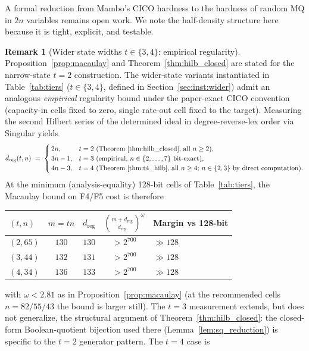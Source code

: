 \documentclass[11pt,a4paper]{article}
\theoremstyle{definition}
\newtheorem{remark}[theorem]{Remark}
\begin{document}
A formal reduction from Mambo's CICO hardness to the hardness of
random MQ in $2n$ variables remains open work. We note the half-density
structure here because it is tight, explicit, and testable.

\begin{remark}[Wider state widths $t \in \{3, 4\}$: empirical regularity]\label{rem:dreg_wider}
Proposition~\ref{prop:macaulay} and Theorem~\ref{thm:hilb_closed} are
stated for the narrow-state $t = 2$ construction. The wider-state
variants instantiated in Table~\ref{tab:tiers} ($t \in \{3, 4\}$,
defined in Section~\ref{sec:inst:wider}) admit an analogous
\emph{empirical} regularity bound under the paper-exact CICO
convention (capacity-in cells fixed to zero, single rate-out cell
fixed to the target). Measuring the second Hilbert series of the
determined ideal in degree-reverse-lex order via Singular yields
\[
  d_{\mathrm{reg}}(t, n) \;=\;
  \begin{cases}
    \,2n, & t = 2\ (\text{Theorem~\ref{thm:hilb_closed}, all $n \ge 2$}), \\
    \,3n - 1, & t = 3\ (\text{empirical, $n \in \{2, \ldots, 7\}$ bit-exact}), \\
    \,4n - 3, & t = 4\ (\text{Theorem~\ref{thm:t4_hilb}, all $n \ge 4$; $n \in \{2,3\}$ by direct computation}).
  \end{cases}
\]
At the minimum (analysis-equality) 128-bit cells of
Table~\ref{tab:tiers}, the Macaulay bound on F4/F5 cost is therefore
\begin{center}
\begin{tabular}{@{}lcccl@{}}
\toprule
$(t, n)$ & $m = tn$ & $d_{\mathrm{reg}}$ & $\binom{m+d_{\mathrm{reg}}}{d_{\mathrm{reg}}}^{\!\omega}$ & Margin vs 128-bit \\
\midrule
$(2, 65)$ & $130$ & $130$ & $> 2^{700}$ & $\gg 128$ \\
$(3, 44)$ & $132$ & $131$ & $> 2^{700}$ & $\gg 128$ \\
$(4, 34)$ & $136$ & $133$ & $> 2^{700}$ & $\gg 128$ \\
\bottomrule
\end{tabular}
\end{center}
with $\omega < 2.81$ as in Proposition~\ref{prop:macaulay} (at the
recommended cells $n = 82/55/43$ the bound is larger still). The
$t = 3$ measurement extends, but does not generalize, the structural
argument of Theorem~\ref{thm:hilb_closed}: the closed-form
Boolean-quotient bijection used there (Lemma~\ref{lem:sq_reduction})
is specific to the $t = 2$ generator pattern. The $t = 4$ case is

\end{remark}
\end{document}
